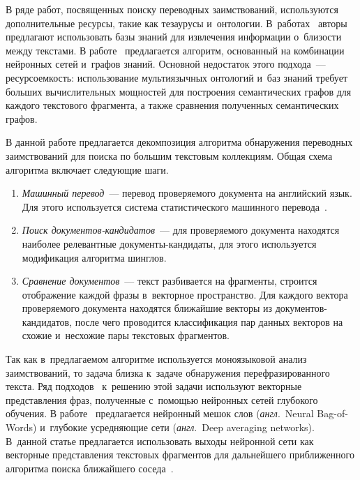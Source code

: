 \begin{multicols}{2}
В ряде работ, посвященных поиску переводных заимствований, используются 
дополнительные ресурсы, такие как тезаурусы и~онтологии.
В~работах~\cite{clkga,clfreshonto} авторы предлагают использовать базы знаний 
для извлечения информации о~близости между текстами. В работе~\cite{clfreshonto} 
предлагается алгоритм, основанный на комбинации нейронных сетей и~графов знаний. 
Основной недостаток этого подхода~--- ресурсоемкость: использование 
мультиязычных онтологий и~баз знаний требует больших вычислительных мощностей 
для построения семантических графов для каждого текстового фрагмента, а также 
сравнения полученных семантических графов.

В данной работе предлагается декомпозиция алгоритма обнаружения переводных 
заимствований для поиска по большим текстовым коллекциям.
Общая схема алгоритма включает следующие шаги.
\begin{enumerate}
\item \textit{Машинный перевод}~--- перевод проверяемого документа на английский 
язык. Для этого используется система статистического машинного 
перевода~\cite{moses}.
\item \textit{Поиск до\-ку\-мен\-тов-кан\-ди\-да\-тов}~--- для проверяемого документа 
находятся наиболее релевантные до\-ку\-мен\-ты-кан\-ди\-да\-ты, для этого используется 
модификация алгоритма шинглов.
\item \textit{Сравнение документов}~--- текст разбивается на фрагменты, строится 
отображение каждой фразы в~векторное пространство. Для каждого вектора 
проверяемого документа находятся ближайшие векторы из до\-ку\-мен\-тов-кан\-ди\-да\-тов, 
после чего проводится классификация пар данных векторов на схожие и~несхожие 
пары текстовых фрагментов.
\end{enumerate}

Так как в~предлагаемом алгоритме используется моноязыковой анализ заимствований, 
то задача близка к~задаче обнаружения перефразированного текс\-та.
Ряд подходов~\cite{Socher1,wieting,Iyyer,vbta} к~решению этой задачи используют 
векторные пред\-став\-ле\-ния фраз, полученные с~по\-мощью нейронных сетей глубокого 
обуче\-ния.
В работе~\cite{Iyyer} предлагается  нейронный мешок слов (\textit{англ}.\ Neural Bag-of-Words) 
и~глубокие усред\-ня\-ющие сети (\textit{англ}.\ Deep averaging networks).
В~данной \mbox{статье} предлагается использовать выходы нейронной сети как векторные 
пред\-став\-ле\-ния текс\-то\-вых фрагментов для дальнейшего при\-бли\-жен\-но\-го алгоритма 
поиска бли\-жай\-ше\-го соседа~\cite{ann}.


\end{multicols}
